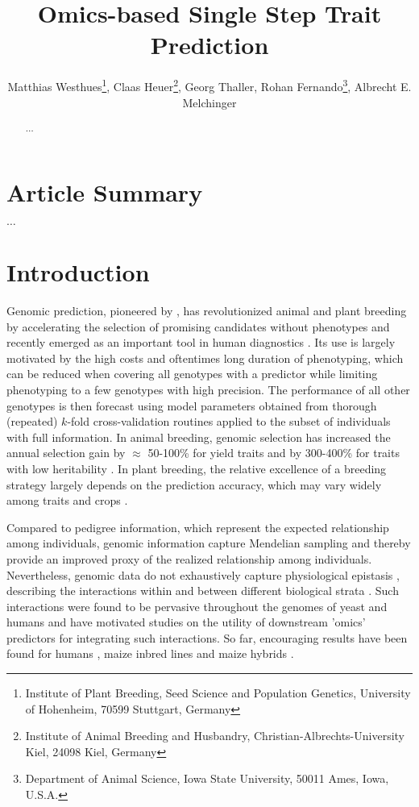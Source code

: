 \documentclass[12pt,titlepage]{article}
\title{Omics-based Single Step Trait Prediction}
\author{
  Matthias Westhues\thanks{Institute of Plant Breeding, Seed Science and Population Genetics, University of Hohenheim, 70599 Stuttgart, Germany},
  Claas Heuer\thanks{Institute of Animal Breeding and Husbandry, Christian-Albrechts-University Kiel, 24098 Kiel, Germany},
  Georg Thaller\samethanks[2],
  Rohan Fernando\thanks{Department of Animal Science, Iowa State University, 50011 Ames, Iowa, U.S.A.},
  Albrecht E. Melchinger\samethanks[1]
}
\begin{document}
\maketitle
\doublespacing
\linenumbers



\begin{abstract}

  $\dots$

\end{abstract}



\section{Article Summary}
$\dots$



\section{Introduction} 
Genomic prediction, pioneered by , has revolutionized
animal and plant breeding by accelerating the selection of promising candidates 
without phenotypes \cite{DeLosCampos2013,Garcia-Ruiz2016} and recently emerged
as an important tool in human diagnostics \cite{DeLosCampos2010,Vazquez2016}.
Its use is largely motivated by the high costs and oftentimes long duration of 
phenotyping, which can be reduced when covering all genotypes with a predictor 
while limiting phenotyping to a few genotypes with high precision.
The performance of all other genotypes is then forecast using model parameters
obtained from thorough (repeated) $k$-fold cross-validation routines applied to 
the subset of individuals with full information.
In animal breeding, genomic selection has increased the annual selection gain 
by $\approx$ 50-100\% for yield traits and by 300-400\% for traits with low 
heritability \cite{Garcia-Ruiz2016}.
In plant breeding, the relative excellence of a breeding strategy largely 
depends on the prediction accuracy, which may vary widely among traits and 
crops \cite{Longin2015}.

Compared to pedigree information, which represent the expected relationship
among individuals, genomic information capture Mendelian sampling and thereby 
provide an improved proxy of the realized relationship among individuals.
Nevertheless, genomic data do not exhaustively capture physiological epistasis 
\cite{Jiang2015,Guo2016,Vazquez2016}, describing the interactions 
within and between different biological strata \cite{Sackton2016}.
Such interactions were found to be pervasive throughout the genomes of yeast 
\cite{Brem2005} and humans \cite{Brown2014} and have motivated studies on the 
utility of downstream 'omics' predictors for integrating such interactions.
So far, encouraging results have been found for humans \cite{Vazquez2016}, maize 
inbred lines \cite{Guo2016} and maize hybrids \cite{Westhues2017}.
\end{document}
